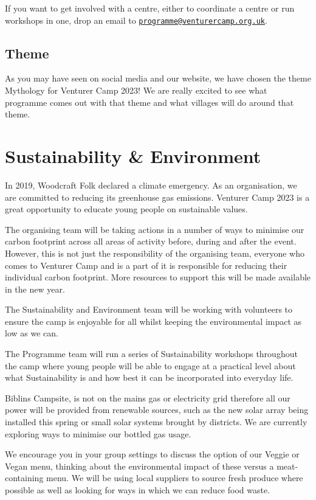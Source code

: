 \documentclass[a4paper, 10pt]{report}
\begin{document}
If you want to get involved with a centre, either to coordinate a centre or run workshops in one, drop an email to \href{mailto:programme@venturercamp.org.uk}{\texttt{programme@venturercamp.org.uk}}.
\section{Theme}
As you may have seen on social media and our website, we have chosen the theme Mythology for Venturer Camp 2023! We are really excited to see what programme comes out with that theme and what villages will do around that theme.

\chapter{Sustainability \& Environment}
In 2019, Woodcraft Folk declared a climate emergency. As an organisation, we are committed to reducing its greenhouse gas emissions. Venturer Camp 2023 is a great opportunity to educate young people on sustainable values.

The organising team will be taking actions in a number of ways to minimise our carbon footprint across all areas of activity before, during and after the event. However, this is not just the responsibility of the organising team, everyone who comes to Venturer Camp and is a part of it is responsible for reducing their individual carbon footprint. More resources to support this will be made available in the new year.

The Sustainability and Environment team will be working with volunteers to ensure the camp is enjoyable for all whilst keeping the environmental impact as low as we can. 

The Programme team will run a series of Sustainability workshops throughout the camp where young people will be able to engage at a practical level about what Sustainability is and how best it can be incorporated into everyday life.

Biblins Campsite, is not on the mains gas or electricity grid therefore all our power will be provided from renewable sources, such as the new solar array being installed this spring or small solar systems brought by districts. We are currently exploring ways to minimise our bottled gas usage.

We encourage you in your group settings to discuss the option of our Veggie or Vegan menu, thinking about the environmental impact of these versus a meat-containing menu. We will be using local suppliers to source fresh produce where possible as well as looking for ways in which we can reduce food waste.
\end{document}
